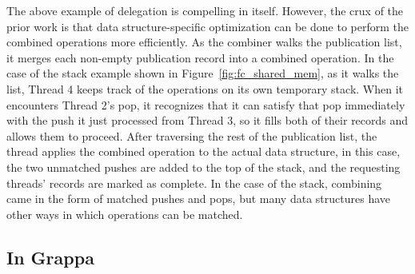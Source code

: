The above example of delegation is compelling in itself. However, the crux of the prior work is that data structure-specific optimization can be done to perform the combined operations more efficiently.
As the combiner walks the publication list, it merges each non-empty publication record into a combined operation. In the case of the stack example shown in Figure~\ref{fig:fc_shared_mem}, as it walks the list, Thread 4 keeps track of the operations on its own temporary stack. When it encounters Thread 2's pop, it recognizes that it can satisfy that pop immediately with the push it just processed from Thread 3, so it fills both of their records and allows them to proceed. After traversing the rest of the publication list, the thread applies the combined operation to the actual data structure, in this case, the two unmatched pushes are added to the top of the stack, and the requesting threads' records are marked as complete.
In the case of the stack, combining came in the form of matched pushes and pops, but many data structures have other ways in which operations can be matched.

\subsection{In Grappa}

